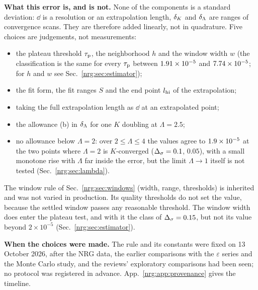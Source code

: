 \textbf{What this error is, and is not.} None of the components is a standard deviation: $\dd$ is a resolution or an extrapolation
length, $\dK$ and $\dL$ are ranges of convergence scans. They are therefore added linearly, not in quadrature. Five choices are
judgements, not measurements:
\begin{itemize}
\item the plateau threshold $\tau_{\rm p}$, the neighborhood $h$ and the window width $w$ (the classification is the same for every
  $\tau_{\rm p}$ between $1.91\times10^{-5}$ and $7.74\times10^{-5}$; for $h$ and $w$ see Sec.~\ref{nrg:sec:estimator});
\item the fit form, the fit ranges $S$ and the end point $l_{\rm hi}$ of the extrapolation;
\item taking the full extrapolation length as $\dd$ at an extrapolated point;
\item the allowance (b) in $\dL$ for one $K$ doubling at $\Lambda=2.5$;
\item no allowance below $\Lambda=2$: over $2\le\Lambda\le4$ the values agree to $1.9\times10^{-5}$ at the two points where $\Lambda=2$
  is $K$-converged ($\Delta_\sigma=0.1$, $0.05$), with a small monotone rise with $\Lambda$ far inside the error, but the limit $\Lambda\to1$
  itself is not tested (Sec.~\ref{nrg:sec:lambda}).
\end{itemize}
The window rule of Sec.~\ref{nrg:sec:windows} (width, range, thresholds) is inherited and was not varied in production. Its quality
thresholds do not set the value, because the settled window passes any reasonable threshold. The window width does enter the plateau
test, and with it the class of $\Delta_\sigma=0.15$, but not its value beyond $2\times10^{-5}$ (Sec.~\ref{nrg:sec:estimator}).

\textbf{When the choices were made.} The rule and its constants were fixed on 13 October 2026, after the NRG data, the earlier
comparisons with the $\varepsilon$ series and the Monte Carlo study, and the reviews' exploratory comparisons had been seen; no
protocol was registered in advance. App.~\ref{nrg:app:provenance} gives the timeline.

\begin{table}[ht]\centering\footnotesize\setlength{\tabcolsep}{4pt}
\caption{Error budget. Columns: estimator (plateau, extrapolated, or settled for the points not converged in chain depth); $\DE$ to six
decimals; the chain-depth error $\dd$, the $K$/$n_b$ spread $\dK$, the discretization error $\dL$ and their linear sum $\dtot$, in
units of $10^{-4}$; the number $\nq$ of quality windows of the central item; the late fit of Sec.~\ref{nrg:sec:crosscheck} minus $\DE$
(cross-check, not adopted; shown for the final points). n.c.: not converged in chain depth.}\label{nrg:tab:budget}

\end{table}

